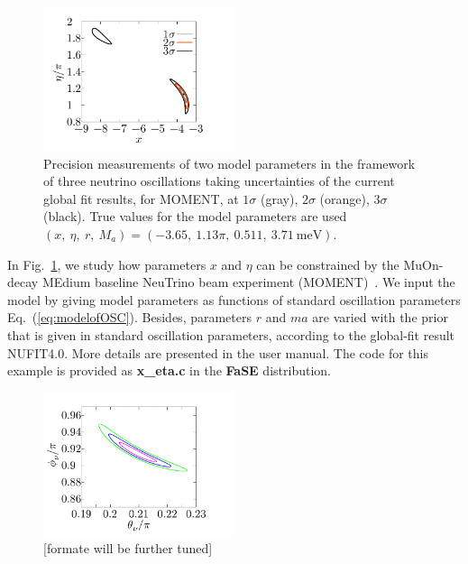 \documentclass[aps,prd,nofootinbib,preprint]{revtex4}
\begin{document}
\begin{figure}[!h]
 \centering
\hspace{15mm}\includegraphics[width=0.5\textwidth]{Figs/x_eta.pdf}
 \caption{\label{fig:x_eta}Precision measurements of two model parameters in the framework of three neutrino oscillations taking uncertainties of the current global fit results, for MOMENT, at $1\sigma$ (gray), $2\sigma$ (orange), $3\sigma$ (black). True values for the model parameters are used $(x,~\eta,~r,~M_a)=(-3.65,~1.13\pi,~0.511,~3.71~\text{meV})$.}
\end{figure}

In Fig.~\ref{fig:x_eta}, we study how parameters $x$ and $\eta$ can be constrained by the MuOn-decay MEdium baseline NeuTrino beam experiment (MOMENT)~\cite{Cao:2014bea}. We input the model by giving model parameters as functions of standard oscillation parameters Eq.~(\ref{eq:modelofOSC}). Besides, parameters $r$ and $ma$ are varied with the prior that is given in standard oscillation parameters, according to the global-fit result NUFIT4.0. More details are presented in the user manual. The code for this example is provided as \textbf{x\_eta.c} in the \textbf{FaSE} distribution.

\begin{figure}[!h]
 \centering
\hspace{15mm}\includegraphics[width=0.5\textwidth]{Figs/theta_phi.pdf}
 \caption{\label{fig:theta_phi} {\color{red}[formate will be further tuned]}}
\end{figure}
\end{document}
